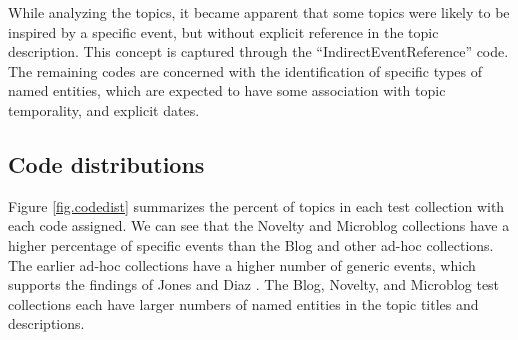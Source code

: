 \documentclass{sig-alternate}
\begin{document}
While analyzing the topics, it became apparent that some topics were likely to be inspired by a specific event, but without explicit reference in the topic description. This concept is captured through the ``IndirectEventReference'' code. The remaining codes are concerned with the identification of specific types of named entities, which are expected to have some  association with topic temporality, and explicit dates.


\subsection{Code distributions}

Figure \ref{fig.codedist} summarizes the percent of topics in each test collection with each code assigned. We can see that the Novelty and Microblog  collections have a higher percentage of specific events than the Blog and other ad-hoc collections. The earlier ad-hoc collections have a higher number of generic events, which supports the findings of Jones and Diaz \cite{Jones2007}. The Blog, Novelty, and Microblog test collections each have larger numbers of named entities in the topic titles and descriptions.
\end{document}
